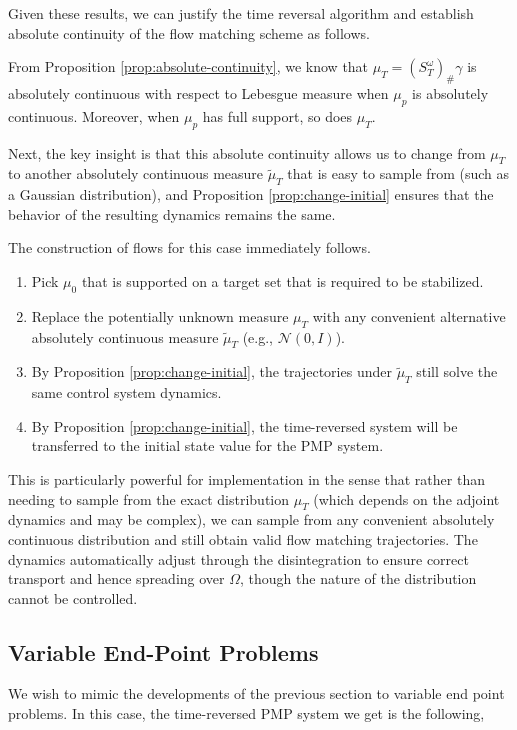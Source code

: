 \documentclass{article}
\begin{document}
Given these results, we can justify the time reversal algorithm and establish absolute continuity of the flow matching scheme as follows.

From Proposition \ref{prop:absolute-continuity}, we know that $\mu_T = (S^\omega_T)_{\#}\gamma$ is absolutely continuous with respect to Lebesgue measure when $\mu_p$ is absolutely continuous. Moreover, when $\mu_p$ has full support, so does $\mu_T$.

Next, the key insight is that this absolute continuity allows us to change from $\mu_T$ to another absolutely continuous measure $\tilde{\mu}_T$ that is easy to sample from (such as a Gaussian distribution), and Proposition \ref{prop:change-initial} ensures that the behavior of the resulting dynamics remains the same. 

The construction of flows for this case immediately follows.

\begin{enumerate}
\item Pick $\mu_0$ that is supported on a target set that is required to be stabilized.
\item Replace the potentially unknown measure $\mu_T$ with any convenient alternative absolutely continuous measure $\tilde{\mu}_T$ (e.g., $\mathcal{N}(0, I)$).
\item By Proposition \ref{prop:change-initial}, the trajectories under $\tilde{\mu}_T$ still solve the same control system dynamics.
\item By Proposition \ref{prop:change-initial}, the time-reversed system will be transferred to the initial state value for the PMP system. 
\end{enumerate}


This is particularly powerful for implementation in the sense that rather than needing to sample from the exact distribution $\mu_T$ (which depends on the adjoint dynamics and may be complex), we can sample from any convenient absolutely continuous distribution and still obtain valid flow matching trajectories. The dynamics automatically adjust through the disintegration to ensure correct transport and hence spreading over $\Omega$, though the nature of the distribution cannot be controlled.

\subsection{Variable End-Point Problems}

We wish to mimic the developments of the previous section to variable end point problems. In this case, the time-reversed PMP system we get is the following,
\end{document}
